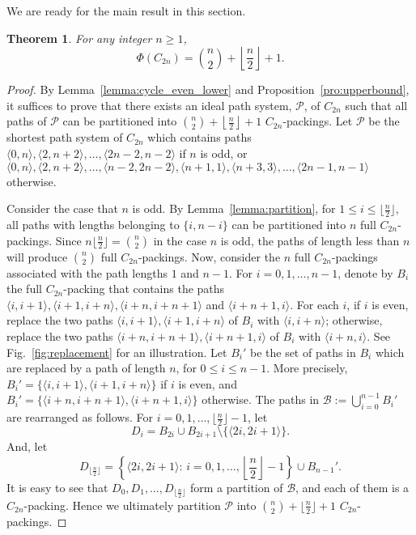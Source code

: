 \documentclass[journal,draftcls,onecolumn,12pt,twoside]{IEEEtran}
\newtheorem{theorem}{\bf Theorem}
\begin{document}
We are ready for the main result in this section.

\begin{theorem}\label{thm:cycle_even}
For any integer $n\geq 1$, $$\Phi(C_{2n})={n\choose 2} + \left\lfloor\frac{n}{2}\right\rfloor + 1.$$
\end{theorem}
\begin{proof}
By Lemma~\ref{lemma:cycle_even_lower} and Proposition~\ref{pro:upperbound}, it suffices to prove that there exists an ideal path system, $\mathcal{P}$, of $C_{2n}$ such that all paths of $\mathcal{P}$ can be partitioned into ${n\choose 2} + \left\lfloor\frac{n}{2}\right\rfloor + 1$ $C_{2n}$-packings.
Let $\mathcal{P}$ be the shortest path system of $C_{2n}$ which contains paths $\langle 0,n\rangle, \langle 2,n+2\rangle, \ldots, \langle 2n-2,n-2\rangle$ if $n$ is odd, or $\langle 0,n\rangle, \langle 2,n+2\rangle, \ldots, \langle n-2,2n-2\rangle, \langle n+1,1\rangle, \langle n+3,3\rangle, \ldots, \langle 2n-1,n-1\rangle$ otherwise.

Consider the case that $n$ is odd.
By Lemma~\ref{lemma:partition}, for $1\leq i\leq\lfloor\frac{n}{2}\rfloor$, all paths with lengths belonging to $\{i,n-i\}$ can be partitioned into $n$ full $C_{2n}$-packings.
Since $n\lfloor\frac{n}{2}\rfloor={n\choose 2}$ in the case $n$ is odd, the paths of length less than $n$ will produce ${n\choose 2}$ full $C_{2n}$-packings.
Now, consider the $n$ full $C_{2n}$-packings associated with the path lengths $1$ and $n-1$.
For $i=0,1,\ldots,n-1$, denote by $B_i$ the full $C_{2n}$-packing that contains the paths $\langle i,i+1\rangle, \langle i+1,i+n\rangle, \langle i+n,i+n+1\rangle$ and $\langle i+n+1,i\rangle$.
For each $i$, if $i$ is even, replace the two paths $\langle i,i+1\rangle, \langle i+1,i+n\rangle$ of $B_i$ with $\langle i,i+n\rangle$; otherwise, replace the two paths $\langle i+n,i+n+1\rangle, \langle i+n+1,i\rangle$ of $B_i$ with $\langle i+n,i\rangle$.
See Fig.~\ref{fig:replacement} for an illustration.
Let $B_i'$ be the set of paths in $B_i$ which are replaced by a path of length $n$, for $0\leq i\leq n-1$.
More precisely, $B_i'=\{\langle i,i+1\rangle, \langle i+1,i+n\rangle\}$ if $i$ is even, and $B_i'=\{\langle i+n,i+n+1\rangle, \langle i+n+1,i\rangle\}$ otherwise.
The paths in $\mathcal{B}:=\bigcup_{i=0}^{n-1} B_i'$ are rearranged as follows.
For $i=0,1,\ldots,\lfloor\frac{n}{2}\rfloor-1$, let $$D_i=B_{2i}\cup B_{2i+1}\setminus \{\langle 2i,2i+1\rangle\}.$$ 
And, let $$D_{\lfloor\frac{n}{2}\rfloor}=\left\{\langle 2i,2i+1\rangle:\,i=0,1,\ldots,\left\lfloor\frac{n}{2}\right\rfloor-1\right\}\cup B_{n-1}'.$$
It is easy to see that $D_0,D_1,\ldots,D_{\lfloor\frac{n}{2}\rfloor}$ form a partition of $\mathcal{B}$, and each of them is a $C_{2n}$-packing.
Hence we ultimately partition $\mathcal{P}$ into ${n\choose 2}+\lfloor\frac{n}{2}\rfloor+1$ $C_{2n}$-packings.


\end{proof}
\end{document}
